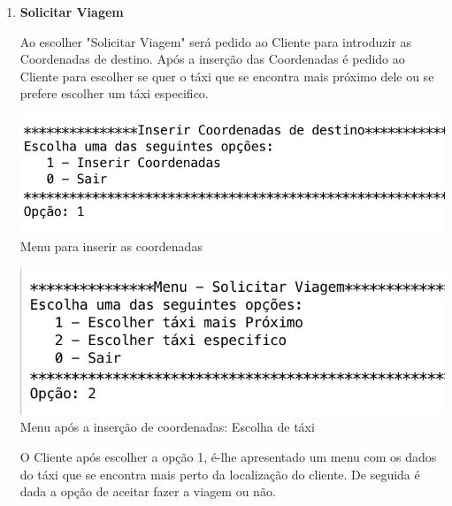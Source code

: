\begin{enumerate}
	\item \textbf{Solicitar Viagem}

Ao escolher "Solicitar Viagem" será pedido ao Cliente para introduzir as Coordenadas de destino. Após a inserção das Coordenadas é pedido ao Cliente para escolher se quer o táxi que se encontra mais próximo dele ou se prefere escolher um táxi especifico. 

\noindent\begin{minipage}[b]{.5\textwidth}
	\includegraphics[scale=0.55]{imagem/inserirDestino}
	\small{Menu para inserir as coordenadas}
\end{minipage} 
\hfill
\begin{minipage}[b]{.45\textwidth}
	\includegraphics[scale=0.55]{imagem/coorInseridas}
	\small{Menu após a inserção de coordenadas: Escolha de táxi}
\end{minipage}
\hfill

O Cliente após escolher a opção 1, é-lhe apresentado um menu com os dados do táxi que se encontra mais perto da localização do cliente. De seguida é dada a opção de aceitar fazer a viagem ou não. 


\end{enumerate}
